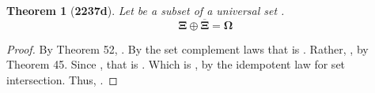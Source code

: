\documentclass[preview]{standalone}
\newtheorem{theorem}{Theorem}
\begin{document}
\begin{theorem}[\textbf{2237d}]
    Let \bm{$\Xi$} be a subset of a universal set \bm{$\Omega$}. 
    \begin{equation*}
        \bm{\Xi \oplus \overline{\Xi} = \Omega}
    \end{equation*}
\end{theorem}
\begin{proof}
    By Theorem 52, 
    \bm{$
    \Xi \oplus \overline{\Xi} 
        = 
    \big \langle \Xi \cup \overline{\Xi} \big \rangle
        - 
    \big \langle \Xi \cap \overline{\Xi} \big \rangle
    $}. 
    By the set complement laws that is \bm{$\Omega - \varnothing$}. 
    Rather, \bm{$\Omega \cap \overline{\bm{\varnothing}}$}, 
    by Theorem 45. 
    Since \bm{$\overline{\bm{\varnothing}} = \Omega$}, that is 
    \bm{$\Omega \cap \Omega$}. Which is \bm{$\Omega$}, 
    by the idempotent law for set intersection.
    Thus, \bm{$\Xi \oplus \overline{\Xi} = \Omega$}.
\end{proof}
\end{document}
